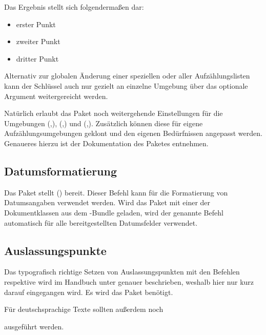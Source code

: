\documentclass[%
  english,ngerman,%
  cdgeometry=no,DIV=12,automark,%
]{tudscrartcl}
\begin{document}
\begin{Preamble*}

\end{Preamble*}
%
Das Ergebnis stellt sich folgendermaßen dar:
%
\begin{Hint*}
\begin{itemize}
\item erster Punkt
\item zweiter Punkt
\item dritter Punkt
\end{itemize}

\end{Hint*}
%
Alternativ zur globalen Änderung einer speziellen oder aller Aufzählungslisten 
kann der Schlüssel  auch nur gezielt an einzelne Umgebung 
über das optionale Argument weitergereicht werden.

Natürlich erlaubt das Paket noch weitergehende Einstellungen für die Umgebungen 
(,),
(,) und
(,). 
Zusätzlich können diese für eigene Aufzählungsumgebungen geklont und den 
eigenen Bedürfnissen angepasst werden. Genaueres hierzu ist der Dokumentation 
des Paketes  entnehmen.


\subsection{Datumsformatierung}
Das Paket  stellt () bereit. 
Dieser Befehl kann für die Formatierung von Datumsangaben verwendet werden. 
Wird das Paket mit einer der Dokumentklassen aus dem \TUDScript-Bundle geladen, 
wird der genannte Befehl automatisch für alle bereitgestellten Datumsfelder 
verwendet.
%
\begin{Preamble}
\usepackage{isodate}

\end{Preamble}


\subsection{Auslassungspunkte}
Das typografisch richtige Setzen von Auslassungspunkten mit den Befehlen 
 respektive  wird im Handbuch unter 
 genauer 
beschrieben, weshalb hier nur kurz darauf eingegangen wird. Es wird das Paket 
 benötigt.
%
\begin{Preamble}
\usepackage{ellipsis}
\end{Preamble}
%
Für deutschsprachige Texte sollten außerdem noch 
%
\begin{Preamble}
\let\ellipsispunctuation\relax

\end{Preamble}
%
ausgeführt werden.
\end{document}
